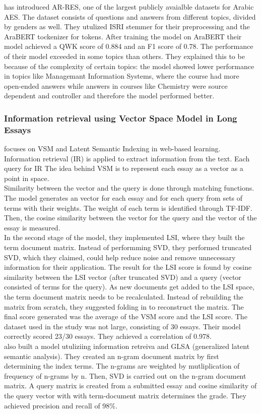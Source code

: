 \documentclass{article}
\begin{document}
\textbf{\textcite{23_ghazawi2024bert}} has introduced AR-RES, one of the largest publicly avaialble datasets for Arabic AES. The dataset consists of questions and answers from different topics, divided by genders as well. They utulized ISRI stemmer for their preprocessing and the AraBERT tockenizer for tokens. After training the model on AraBERT their model achieved a QWK score of 0.884 and an F1 score of 0.78. The performance of their model exceeded in some topics than others. They explained this to be because of the complexity of certain topics: the model showed lower performance in topics like Managemant Information Systems, where the course had more open-ended answers while answers in courses like Chemistry were source dependent and controller and therefore the model performed better. 


\subsubsection{Information retrieval using Vector Space Model in Long Essays}
\textbf{\textcite{17_abbas2015svm}} focuses on VSM and Latent Semantic Indexing in web-based learning. Information retrieval (IR) is applied to extract information from the text. Each query for IR  The idea behind VSM is to represent each essay as a vector as a point in space. \\ Similarity between the vector and the query is done through matching functions. The model generates an vector for each essay and for each query from sets of terms with their weights. The weight of each term is identified through TF-IDF. Then, the cosine similarity between the vector for the query and the vector of the essay is measured. \\ In the second stage of the model, they implemented LSI, where they built the term document matrix. Instead of performming SVD, they performed truncated SVD, which they claimed, could help reduce noise and remove unnecessary information for their application. The result for the LSI score is found by cosine similarity between the LSI vector (after truncated SVD) and a query (vector consisted of terms for the query). As new documents get added to the LSI space, the term document matrix needs to be recalculated. Instead of rebuilding the matrix from scratch, they suggested folding in to reconstruct the matrix. The final score generated was the average of the VSM score and the LSI score. The dataset used in the study was not large, consisting of 30 essays. Their model correctly scored 23/30 essays. They achieved a correlation of 0.978. \\
\textbf{\textcite{24_islam2013abess}} also built a model utuliziing information retreiva and GLSA (generalized latent semantic analysis). They created an n-gram document matrix by first determining the index terms. The n-grams are weighted by mutliplication of frequency of n-grams by n. Then, SVD is carried out on the n-gram document matrix. A query matrix is created from a submitted essay and cosine similarity of the query vector with with term-document matrix determines the grade. They achieved precision and recall of 98\%. 
\end{document}
